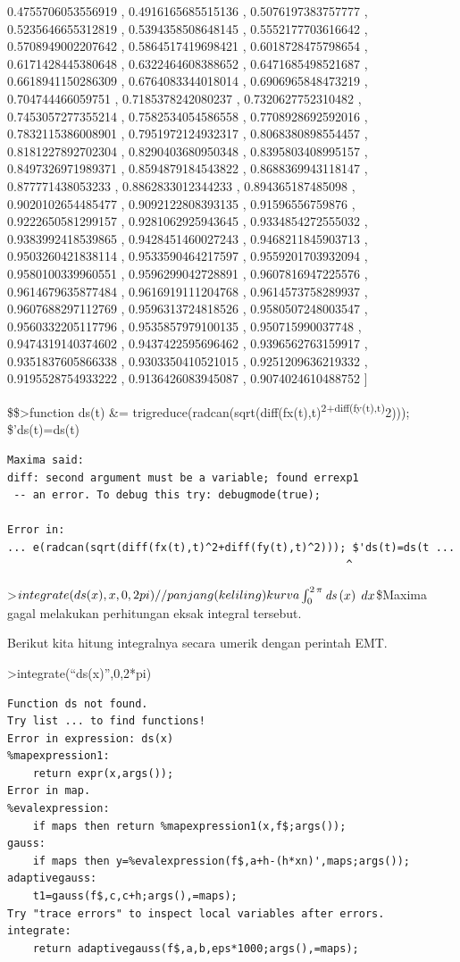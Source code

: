 \documentclass[
]{book}
\begin{document}
 0.4755706053556919 , 0.4916165685515136 , 0.5076197383757777 , 
 0.5235646655312819 , 0.5394358508648145 , 0.5552177703616642 , 
 0.5708949002207642 , 0.5864517419698421 , 0.6018728475798654 , 
 0.6171428445380648 , 0.6322464608388652 , 0.6471685498521687 , 
 0.6618941150286309 , 0.6764083344018014 , 0.6906965848473219 , 
 0.704744466059751 , 0.7185378242080237 , 0.7320627752310482 , 
 0.7453057277355214 , 0.7582534054586558 , 0.7708928692592016 , 
 0.7832115386008901 , 0.7951972124932317 , 0.8068380898554457 , 
 0.8181227892702304 , 0.8290403680950348 , 0.8395803408995157 , 
 0.8497326971989371 , 0.8594879184543822 , 0.8688369943118147 , 
 0.877771438053233 , 0.8862833012344233 , 0.894365187485098 , 
 0.9020102654485477 , 0.9092122808393135 , 0.91596556759876 , 
 0.9222650581299157 , 0.9281062925943645 , 0.9334854272555032 , 
 0.9383992418539865 , 0.9428451460027243 , 0.9468211845903713 , 
 0.9503260421838114 , 0.9533590464217597 , 0.9559201703932094 , 
 0.9580100339960551 , 0.9596299042728891 , 0.9607816947225576 , 
 0.9614679635877484 , 0.9616919111204768 , 0.9614573758289937 , 
 0.9607688297112769 , 0.9596313724818526 , 0.9580507248003547 , 
 0.9560332205117796 , 0.9535857979100135 , 0.950715990037748 , 
 0.9474319140374602 , 0.9437422595696462 , 0.9396562763159917 , 
 0.9351837605866338 , 0.9303350410521015 , 0.9251209636219332 , 
 0.9195528754933222 , 0.9136426083945087 , 0.9074024610488752
  \right] 

\$\$\textgreater function ds(t) \&= trigreduce(radcan(sqrt(diff(fx(t),t)\textsuperscript{2+diff(fy(t),t)}2))); \$'ds(t)=ds(t)

\begin{verbatim}
Maxima said:
diff: second argument must be a variable; found errexp1
 -- an error. To debug this try: debugmode(true);

Error in:
... e(radcan(sqrt(diff(fx(t),t)^2+diff(fy(t),t)^2))); $'ds(t)=ds(t ...
                                                     ^
\end{verbatim}

\textgreater{}\(integrate(ds(x),x,0,2\*pi) //panjang (keliling) kurva\)\(\int_{0}^{2\,\pi}{{\it ds}\left(x\right)\;dx}\)\$Maxima gagal melakukan perhitungan eksak integral tersebut.

Berikut kita hitung integralnya secara umerik dengan perintah EMT.

\textgreater integrate(``ds(x)'',0,2*pi)

\begin{verbatim}
Function ds not found.
Try list ... to find functions!
Error in expression: ds(x)
%mapexpression1:
    return expr(x,args());
Error in map.
%evalexpression:
    if maps then return %mapexpression1(x,f$;args());
gauss:
    if maps then y=%evalexpression(f$,a+h-(h*xn)',maps;args());
adaptivegauss:
    t1=gauss(f$,c,c+h;args(),=maps);
Try "trace errors" to inspect local variables after errors.
integrate:
    return adaptivegauss(f$,a,b,eps*1000;args(),=maps);
\end{verbatim}
\end{document}

